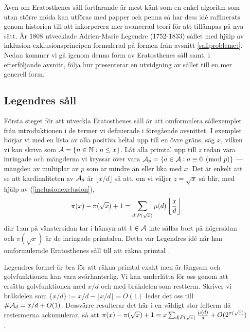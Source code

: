 
Även om Eratosthenes såll fortfarande är mest känt som en enkel algoritm som utan större möda kan utföras med papper och penna så har dess idé raffinerats genom historien till att inkorperera mer avancerad teori för att tillämpas på nya sätt. År 1808 utvecklade Adrien-Marie Legendre (1752-1833) sållet med hjälp av inklusion-exklusionsprincipen formulerad på formen från avsnitt \ref{sallproblemet}. Nedan kommer vi gå igenom denna form av Eratosthenes såll samt, i efterföljande avsnitt, följa hur \cite{cojocarumurty} presenterar en utvidgning av sållet till en mer generell form. 

\subsection{Legendres såll} \label{era.Legendres}

Första steget för att utveckla Eratosthenes såll är att omformulera sållexemplet från introduktionen i de termer vi definierade i föregående avsnittet. I exemplet börjar vi med en lista av alla positiva heltal upp till en övre gräns, säg $x$, vilken vi kan skriva som $\mathcal{A} = \{n \in \mathbb{N} : n \leq x\}$. Låt alla primtal upp till $z$ redan vara inringade och mängderna vi kryssar över vara \(\mathcal{A}_p = \{a \in \mathcal{A} :  a \equiv 0 \pmod{p}\}\) --- mängden av multiplar av $p$ som är mindre än eller lika med $x$. Det är enkelt att se att kardinaliteten av \(\mathcal{A}_d\) är \(\lfloor x/d \rfloor\) så att, om vi väljer $z = \sqrt{x}$ så blir, med hjälp av (\ref{inclusionexclusion}),
\begin{align*}
    \pi(x) - \pi(\sqrt{x}) + 1 = \sum_{d \mid P(\sqrt{x})} \mu(d) \left\lfloor \frac{x}{d} \right\rfloor  
\end{align*}
där \(1\):an på vänstersidan tar i hänsyn att \(1 \in \mathcal{A}\) inte sållas bort på högersidan och \(\pi(\sqrt{x})\) är de inringade primtalen. Detta var Legendres idé när han omformulerade Eratosthenes såll till att räkna primtal \cite[kapitel 1.1]{opera}. 

Legendres formel är bra för att räkna primtal exakt men är långsam och golvfunktionen kan vara svårhanterlig. Vi kan underlätta för oss genom att ersätta golvfunktionen med $x/d$ och med bråkdelen som restterm. Skriver vi bråkdelen som \(\{x/d\} := x/d - \lfloor x/d \rfloor = O(1)\) leder det oss till \(\# \mathcal{A}_d = x/d + O(1)\). Dessvärre resulterar det här i en väldigt stor felterm då restermerna ackumulerar, så att \(\pi(x) - \pi(\sqrt{x}) + 1 = x \sum_{d \mid P(\sqrt{x})}\frac{\mu(d)}{d} + O(2^{\pi(\sqrt{x})}) \).

